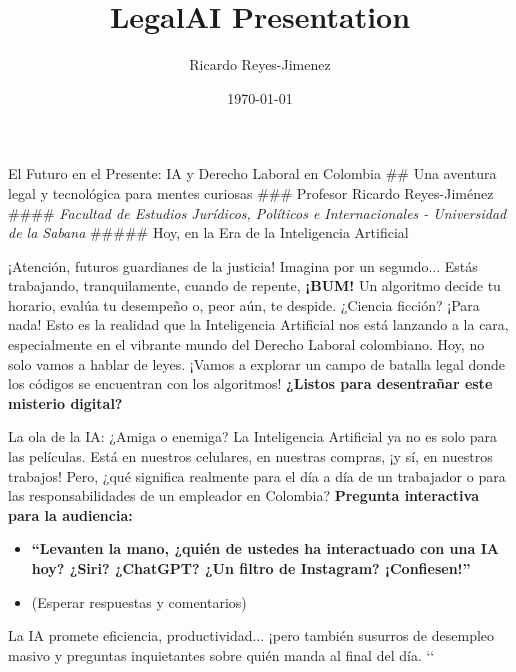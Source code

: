 \documentclass[aspectratio=169]{beamer}
\title[LegalAI Presentation]{LegalAI Presentation}
\subtitle{}
\author{Ricardo Reyes-Jimenez}
\institute{Universidad de La Sabana}
\date{\today}
\begin{document}
\begin{frame}
  \titlepage
\end{frame}

\usebackgroundtemplate{}


\begin{frame}{El Futuro en el Presente: IA y Derecho Laboral en Colombia}
## Una aventura legal y tecnológica para mentes curiosas
### Profesor Ricardo Reyes-Jiménez
#### \textit{Facultad de Estudios Jurídicos, Políticos e Internacionales - Universidad de la Sabana}
##### Hoy, en la Era de la Inteligencia Artificial
\end{frame}


\begin{frame}{¡Atención, futuros guardianes de la justicia!}
Imagina por un segundo... Estás trabajando, tranquilamente, cuando de repente, \textbf{¡BUM!} Un algoritmo decide tu horario, evalúa tu desempeño o, peor aún, te despide. ¿Ciencia ficción? ¡Para nada! Esto es la realidad que la Inteligencia Artificial nos está lanzando a la cara, especialmente en el vibrante mundo del Derecho Laboral colombiano.
Hoy, no solo vamos a hablar de leyes. ¡Vamos a explorar un campo de batalla legal donde los códigos se encuentran con los algoritmos!
\textbf{¿Listos para desentrañar este misterio digital?}
\end{frame}


\begin{frame}{La ola de la IA: ¿Amiga o enemiga?}
La Inteligencia Artificial ya no es solo para las películas. Está en nuestros celulares, en nuestras compras, ¡y sí, en nuestros trabajos! Pero, ¿qué significa realmente para el día a día de un trabajador o para las responsabilidades de un empleador en Colombia?
\textbf{Pregunta interactiva para la audiencia:}
\begin{itemize}
  \item \textbf{``Levanten la mano, ¿quién de ustedes ha interactuado con una IA hoy? ¿Siri? ¿ChatGPT? ¿Un filtro de Instagram? ¡Confiesen!''}
  \item (Esperar respuestas y comentarios)
\end{itemize}
La IA promete eficiencia, productividad... ¡pero también susurros de desempleo masivo y preguntas inquietantes sobre quién manda al final del día. `\cite{Gauthier, G. (2024)}`
\end{frame}
\end{document}
